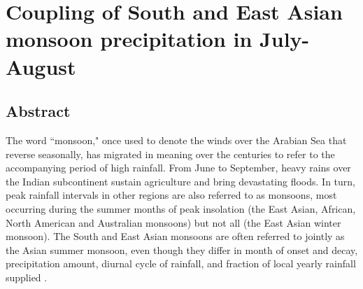 \chapter{Coupling of South and East Asian monsoon precipitation in July-August}

\section{Abstract}

	The word ``monsoon," once used to denote the winds over the Arabian Sea that reverse seasonally, has migrated in meaning over the centuries to refer to the accompanying period of high rainfall. From June to September, heavy rains over the Indian subcontinent sustain agriculture \parencite{Gadgil2006} and bring devastating floods. In turn, peak rainfall intervals in other regions are also referred to as monsoons, most occurring during the summer months of peak insolation (the East Asian, African, North American and Australian monsoons) but not all (the East Asian winter monsoon). The South and East Asian monsoons are often referred to jointly as the Asian summer monsoon, even though they differ in month of onset and decay, precipitation amount, diurnal cycle of rainfall, and fraction of local yearly rainfall supplied \parencite{Zhou2008,Molnar2010,Biasutti2011}.

